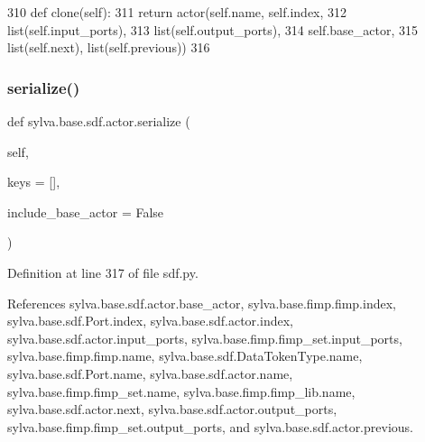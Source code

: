 \begin{DoxyCode}
310         \textcolor{keyword}{def }clone(self):
311             \textcolor{keywordflow}{return} actor(self.name, self.index,
312                          list(self.input\_ports),
313                          list(self.output\_ports),
314                          self.base\_actor,
315                          list(self.next), list(self.previous))
316 
\end{DoxyCode}
\mbox{\label{classsylva_1_1base_1_1sdf_1_1actor_abad5148eadd915c067c20ee575f56e1e}} 
\subsubsection{\texorpdfstring{serialize()}{serialize()}}
{\footnotesize\ttfamily def sylva.\+base.\+sdf.\+actor.\+serialize (\begin{DoxyParamCaption}\item[{}]{self,  }\item[{}]{keys = {\ttfamily \mbox{[}\mbox{]}},  }\item[{}]{include\+\_\+base\+\_\+actor = {\ttfamily False} }\end{DoxyParamCaption})}



Definition at line 317 of file sdf.\+py.



References sylva.\+base.\+sdf.\+actor.\+base\+\_\+actor, sylva.\+base.\+fimp.\+fimp.\+index, sylva.\+base.\+sdf.\+Port.\+index, sylva.\+base.\+sdf.\+actor.\+index, sylva.\+base.\+sdf.\+actor.\+input\+\_\+ports, sylva.\+base.\+fimp.\+fimp\+\_\+set.\+input\+\_\+ports, sylva.\+base.\+fimp.\+fimp.\+name, sylva.\+base.\+sdf.\+Data\+Token\+Type.\+name, sylva.\+base.\+sdf.\+Port.\+name, sylva.\+base.\+sdf.\+actor.\+name, sylva.\+base.\+fimp.\+fimp\+\_\+set.\+name, sylva.\+base.\+fimp.\+fimp\+\_\+lib.\+name, sylva.\+base.\+sdf.\+actor.\+next, sylva.\+base.\+sdf.\+actor.\+output\+\_\+ports, sylva.\+base.\+fimp.\+fimp\+\_\+set.\+output\+\_\+ports, and sylva.\+base.\+sdf.\+actor.\+previous.


